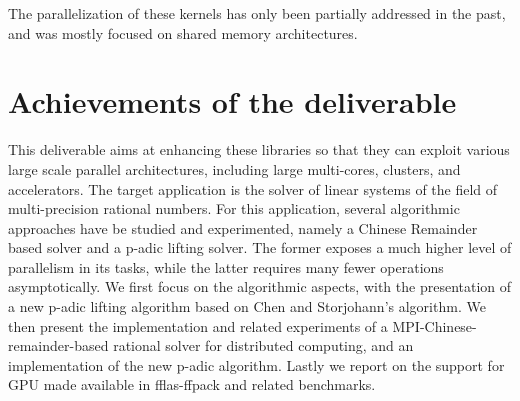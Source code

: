 The parallelization of these kernels has only been partially addressed
in the past, and was mostly focused on shared memory architectures.

\hypertarget{achievements-of-the-deliverable}{%
\section*{Achievements of the
deliverable}\label{achievements-of-the-deliverable}}

This deliverable aims at enhancing these libraries so that they can
exploit various large scale parallel architectures, including large
multi-cores, clusters, and accelerators. The target application is the
solver of linear systems of the field of multi-precision rational
numbers. For this application, several algorithmic approaches have be
studied and experimented, namely a Chinese Remainder based solver and a
p-adic lifting solver. The former exposes a much higher level of
parallelism in its tasks, while the latter requires many fewer
operations asymptotically. We first focus on the algorithmic aspects,
with the presentation of a new p-adic lifting algorithm based on Chen
and Storjohann's algorithm. We then present the implementation and
related experiments of a MPI-Chinese-remainder-based rational solver for
distributed computing, and an implementation of the new p-adic
algorithm. Lastly we report on the support for GPU made available in
fflas-ffpack and related benchmarks.
